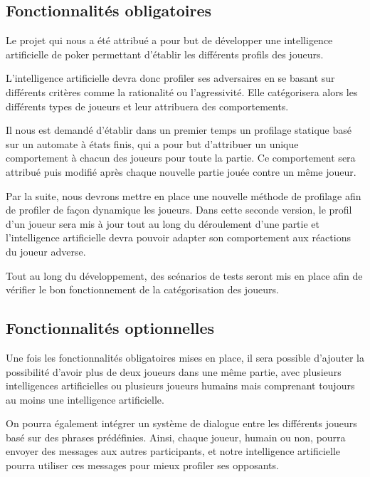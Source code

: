 \documentclass{report}
\begin{document}
\subsection{Fonctionnalités obligatoires}

\hspace{0.5cm}Le projet qui nous a été attribué a pour but de développer une intelligence artificielle de poker permettant d'établir les différents profils des joueurs.\par
L'intelligence artificielle devra donc profiler ses adversaires en se basant sur différents critères comme la rationalité ou l'agressivité. Elle catégorisera alors les différents types de joueurs et leur attribuera des comportements.\par
Il nous est demandé d'établir dans un premier temps un profilage statique basé sur un automate à états finis, qui a pour but d'attribuer un unique comportement à chacun des joueurs pour toute la partie. Ce comportement sera attribué puis modifié après chaque nouvelle partie jouée contre un même joueur.\par
Par la suite, nous devrons mettre en place une nouvelle méthode de profilage afin de profiler de façon dynamique les joueurs. Dans cette seconde version, le profil d'un joueur sera mis à jour tout au long du déroulement d'une partie et l'intelligence artificielle devra pouvoir adapter son comportement aux réactions du joueur adverse.\par
Tout au long du développement, des scénarios de tests seront mis en place afin de vérifier le bon fonctionnement de la catégorisation des joueurs.\par

\subsection{Fonctionnalités optionnelles}

\hspace{0.5cm}Une fois les fonctionnalités obligatoires mises en place, il sera possible d'ajouter la possibilité d'avoir plus de deux joueurs dans une même partie, avec plusieurs intelligences artificielles ou plusieurs joueurs humains mais comprenant toujours au moins une intelligence artificielle.\par
On pourra également intégrer un système de dialogue entre les différents joueurs basé sur des phrases prédéfinies. Ainsi, chaque joueur, humain ou non, pourra envoyer des messages aux autres participants, et notre intelligence artificielle pourra utiliser ces messages pour mieux profiler ses opposants.\par 
\end{document}

